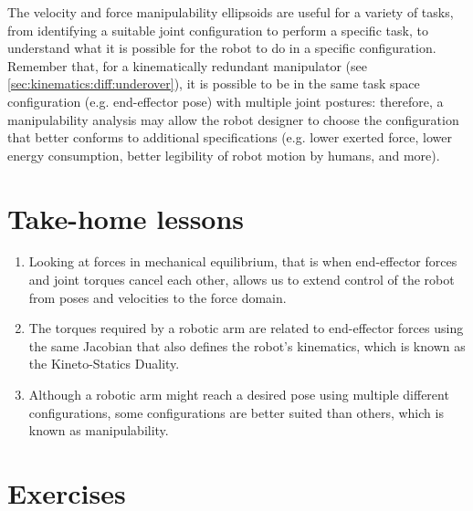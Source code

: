 The velocity and force manipulability ellipsoids are useful for a variety of tasks, from identifying a suitable joint configuration to perform a specific task, to understand what it is possible for the robot to do in a specific configuration. Remember that, for a kinematically redundant manipulator (see \cref{sec:kinematics:diff:underover}), it is possible to be in the same task space configuration (e.g. end-effector pose) with multiple joint postures: therefore, a manipulability analysis may allow the robot designer to choose the configuration that better conforms to additional specifications (e.g. lower exerted force, lower energy consumption, better legibility of robot motion by humans, and more).




\section*{Take-home lessons}
\begin{enumerate}
\item Looking at forces in mechanical equilibrium, that is when end-effector forces and joint torques cancel each other, allows us to extend control of the robot from poses and velocities to the force domain.
\item The torques required by a robotic arm are related to end-effector forces using the same Jacobian that also defines the robot’s kinematics, which is known as the Kineto-Statics Duality.
\item Although a robotic arm might reach a desired pose using multiple different configurations, some configurations are better suited than others, which is known as manipulability.
\end{enumerate}

\section*{Exercises}\small


